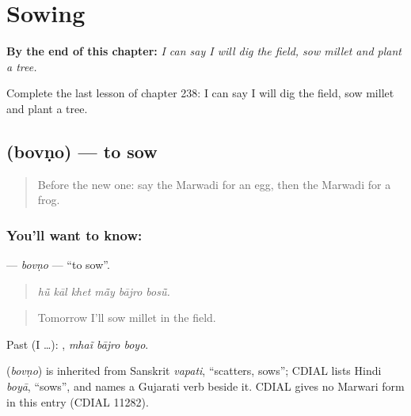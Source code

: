 
\chapter{Sowing}
\label{ch:mw-sowing}

\begin{chapteropening}
\textbf{By the end of this chapter:} \emph{I can say I will dig the field, sow millet and plant a tree.}

Complete the last lesson of chapter 238: I can say I will dig the field, sow millet and plant a tree.
\end{chapteropening}

\section[\texorpdfstring{\mw{बोवणो} (bovṇo)}{बोवणो (bovṇo)}]{ (bovṇo) — to sow}

\label{lesson:MW-C238-bovno}



\begin{quote}
Before the new one: say the Marwadi for an egg, then the Marwadi for a frog.
\end{quote}

\subsection*{You'll want to know: }
\textbf{} — \emph{bovṇo} — \textquotedblleft{}to sow\textquotedblright{}.

\begin{quote}
     
\end{quote}

\begin{quote}
\emph{hū̃ kāl khet mā̃y bājro bosū̃.}
\end{quote}

\begin{quote}
Tomorrow I'll sow millet in the field.
\end{quote}

Past (I …):   , \emph{mhaĩ bājro boyo}.

\begin{cousinweb}
\textbf{} (\emph{bovṇo}) is inherited from Sanskrit \emph{vapati}, \textquotedblleft{}scatters, sows\textquotedblright{}; CDIAL lists Hindi \emph{boyā}, \textquotedblleft{}sows\textquotedblright{}, and names a Gujarati verb beside it. CDIAL gives no Marwari form in this entry (CDIAL 11282).
\end{cousinweb}

